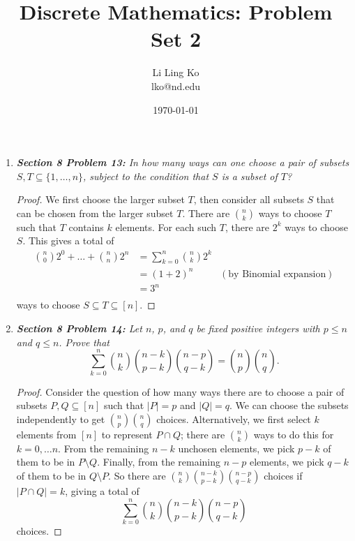 \documentclass{article}
\begin{document}
\title{Discrete Mathematics: Problem Set 2}
\author{Li Ling Ko\\ lko@nd.edu}
\date{\today}
\maketitle

\begin{enumerate}[label={\bf Q\arabic*:}]
  \item \it \textbf{Section 8 Problem 13:} In how many ways can one choose
    a pair of subsets $S,T\subseteq\{1,\ldots,n\}$, subject to the
    condition that $S$ is a subset of $T$?

    \begin{proof}
      We first choose the larger subset $T$, then consider all subsets $S$
      that can be chosen from the larger subset $T$. There are
      $\binom{n}{k}$ ways to choose $T$ such that $T$ contains $k$
      elements. For each such $T$, there are $2^k$ ways to choose $S$. This
      gives a total of
      \begin{align*}
        \binom{n}{0}2^0+\ldots+\binom{n}{n}2^n
          &=\sum_{k=0}^n\binom{n}{k}2^k\\
          &=(1+2)^n &(\text{by Binomial expansion})\\
          &=3^n\\
      \end{align*}
      ways to choose $S\subseteq T\subseteq[n]$.
    \end{proof}

  \item \it \textbf{Section 8 Problem 14:} Let $n$, $p$, and $q$ be fixed
    positive integers with $p\leq n$ and $q\leq n$. Prove that
    \[\sum_{k=0}^n \binom{n}{k}\binom{n-k}{p-k}\binom{n-p}{q-k}
    =\binom{n}{p}\binom{n}{q}.\]

    \begin{proof}
      Consider the question of how many ways there are to choose a pair of
      subsets $P,Q\subseteq[n]$ such that $|P|=p$ and $|Q|=q$. We can
      choose the subsets independently to get $\binom{n}{p}\binom{n}{q}$
      choices. Alternatively, we first select $k$ elements from $[n]$ to
      represent $P\cap Q$; there are $\binom{n}{k}$ ways to do this for
      $k=0,\ldots n$. From the remaining $n-k$ unchosen elements, we pick
      $p-k$ of them to be in $P\setminus Q$. Finally, from the remaining
      $n-p$ elements, we pick $q-k$ of them to be in $Q\setminus P$. So
      there are $\binom{n}{k}\binom{n-k}{p-k}\binom{n-p}{q-k}$ choices
      if $|P\cap Q|=k$, giving a total of 
      \[\sum_{k=0}^n \binom{n}{k}\binom{n-k}{p-k}\binom{n-p}{q-k}\]
      choices.
    \end{proof}
\end{enumerate}
\end{document}
